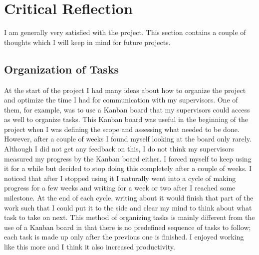 \documentclass[]{article}
\begin{document}
\section{Critical Reflection}
\label{section:criticalreflection}
I am generally very satisfied with the project. This section contains a couple of thoughts which I will keep in mind for future projects.

\subsection{Organization of Tasks}

At the start of the project I had many ideas about how to organize the project and optimize the time I had for communication with my supervisors. One of them, for example, was to use a Kanban board \cite{esparrago1988kanban} that my supervisors could access as well to organize tasks. This Kanban board was useful in the beginning of the project when I was defining the scope and assessing what needed to be done. However, after a couple of weeks I found myself looking at the board only rarely. Although I did not get any feedback on this, I do not think my supervisors measured my progress by the Kanban board either. I forced myself to keep using it for a while but decided to stop doing this completely after a couple of weeks. I noticed that after I stopped using it I naturally went into a cycle of making progress for a few weeks and writing for a week or two after I reached some milestone. At the end of each cycle, writing about it would finish that part of the work such that I could put it to the side and clear my mind to think about what task to take on next. This method of organizing tasks is mainly different from the use of a Kanban board in that there is no predefined sequence of tasks to follow; each task is made up only after the previous one is finished. I enjoyed working like this more and I think it also increased productivity.

\end{document}
